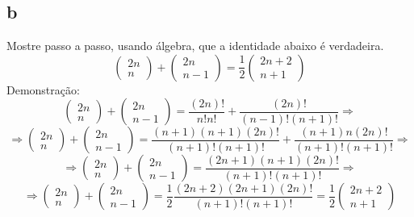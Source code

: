 \documentclass{article}[twocolumn]
\begin{document}
	\subsection{b}
	Mostre passo a passo, usando álgebra, que a identidade abaixo é verdadeira.
	\begin{equation}
		\left(\begin{array}{c}
			2n \\ n
		\end{array}\right)
		+
		\left(\begin{array}{c}
			2n \\ n - 1
		\end{array}\right)
		=
		\frac{1}{2}\left(\begin{array}{c}
			2n + 2 \\ n + 1
		\end{array}\right)
	\end{equation}
	Demonstração:
	\begin{equation}
		\left(\begin{array}{c}
			2n \\ n
		\end{array}\right)
		+
		\left(\begin{array}{c}
			2n \\ n - 1
		\end{array}\right)
		=
		\frac{(2n)!}{n!n!} + \frac{(2n)!}{(n - 1)!(n + 1)!} \Rightarrow
	\end{equation}
	\begin{equation}
		\Rightarrow
		\left(\begin{array}{c}
			2n \\ n
		\end{array}\right)
		+
		\left(\begin{array}{c}
			2n \\ n - 1
		\end{array}\right)
		= \frac{(n + 1)(n + 1)(2n)!}{(n + 1)!(n + 1)!}
		+ \frac{(n + 1)n(2n)!}{(n + 1)!(n + 1)!} \Rightarrow
	\end{equation}
	\begin{equation}
		\Rightarrow
		\left(\begin{array}{c}
			2n \\ n
		\end{array}\right)
		+
		\left(\begin{array}{c}
			2n \\ n - 1
		\end{array}\right)
		= \frac{(2n + 1)(n + 1)(2n)!}{(n + 1)!(n + 1)!} \Rightarrow
	\end{equation}
	\begin{equation}
		\Rightarrow
		\left(\begin{array}{c}
			2n \\ n
		\end{array}\right)
		+
		\left(\begin{array}{c}
			2n \\ n - 1
		\end{array}\right)
		= \frac{1}{2}\frac{(2n + 2)(2n + 1)(2n)!}{(n + 1)!(n + 1)!}
		=
		\frac{1}{2}\left(\begin{array}{c}
			2n + 2 \\ n + 1
		\end{array}\right)
	\end{equation}
\end{document}
